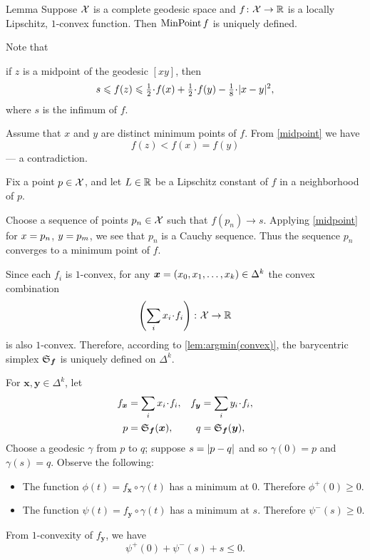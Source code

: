 \begin{thm}{Lemma}\label{lem:argmin(convex)}
Suppose $\mathcal{X}$ is a complete geodesic space and $f\:\spc{X}\z\to\RR$ is a locally Lipschitz, $1$-convex function.
Then $\mathop{\rm MinPoint} f$ is uniquely defined.
\end{thm}

Note that
\begin{clm}{}\label{midpoint}
 if $z$ is a midpoint of the geodesic $[x y]$, then 
\[s\le f(z)
\le
\tfrac{1}{2}\cdot f(x)+\tfrac{1}{2}\cdot f(y)-\tfrac{1}{8}\cdot\dist[2]{x}{y}{},
\]
where $s$ is the infimum of $f$.
\end{clm}

Assume that $x$ and $y$ are distinct minimum points of $f$. 
From \ref{midpoint} we have
\[f(z)<f(x)=f(y)\] 
--- a contradiction. 

Fix a point $p\in \mathcal{X}$, and
let $L\in\mathbb{R}$ be a Lipschitz constant of $f$ in a neighborhood of $p$.

Choose a sequence of points $p_n\in \mathcal{X}$ such that $f(p_n)\to s$.
Applying \ref{midpoint} for $x\z=p_n$, $y\z=p_m$, we see that $p_n$ is a Cauchy sequence.
Thus the sequence $p_n$ converges to a minimum point of $f$.
\qeds

Since each $f_i$ is $1$-convex, for any $\bm{x}=(x_0,x_1,\dots,x_k)\z\in\Delta^k$ 
the convex combination 
\[\left(\sum_i x_i\cdot f_i\right)\:\spc{X}\to\RR\] 
is also $1$-convex.
Therefore, according to \ref{lem:argmin(convex)}, the barycentric simplex 
$\mathfrak{S}_{\bm{f}}$ is uniquely defined on $\Delta^k$.
 
For $\bm{x},\bm{y}\in\Delta^k$,
let 
\begin{align*}
f_{\bm{x}}
&=\sum_i x_i\cdot f_i,
&
f_{\bm{y}}
&=\sum_i y_i\cdot f_i,
\\
p
&=\spx{\bm{f}}(\bm{x}),
&
q
&=\spx{\bm{f}}(\bm{y}),
\end{align*}
Choose a geodesic $\gamma$ from $p$ to $q$;
suppose $s=\dist{p}{q}{}$ and so $\gamma(0)=p$ and $\gamma(s)=q$.
Observe the following:
\begin{itemize}
\item The function $\phi(t)=f_{\bm{x}}\circ\gamma(t)$ has a minimum at $0$. 
Therefore $\phi^+(0)\ge 0$.

\item The function $\psi(t)=f_{\bm{y}}\circ\gamma(t)$ has a minimum at $s$. 
Therefore $\psi^-(s)\ge 0$.
\end{itemize}
From $1$-convexity of $f_{\bm{y}}$, we have
\[\psi^+(0)+\psi^-(s)+s\le0.\]

